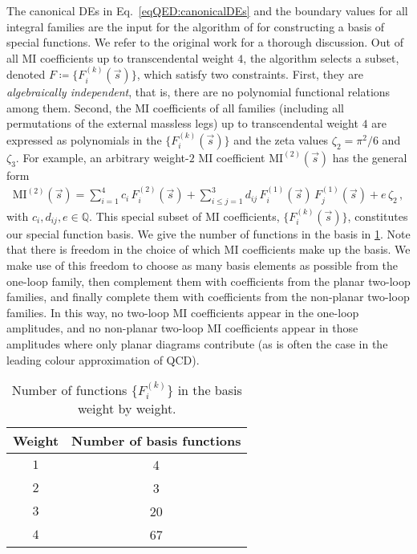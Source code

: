 \documentclass[main.tex]{subfiles}
\begin{document}
The canonical DEs in Eq.~\ref{eqQED:canonicalDEs} and the boundary values for all integral families are the input for the algorithm of  for constructing a basis of special functions. We refer to the original work for a thorough discussion. 
Out of all MI coefficients up to transcendental weight $4$, the algorithm selects a subset, denoted $F \coloneqq \{F^{(k)}_i(\vec{s})\}$, which satisfy two constraints. 
First, they are \emph{algebraically independent}, that is, there are no polynomial functional relations among them. Second, the MI coefficients of all families (including all permutations of the external massless legs) up to transcendental weight $4$ are expressed as polynomials in the $\{F^{(k)}_i(\vec{s})\}$ and the zeta values $\zeta_2 = \pi^2/6$ and $\zeta_3$. For example, an arbitrary weight-$2$ MI coefficient $\text{MI}^{(2)}(\vec{s})$ has the general form
\begin{align}
\text{MI}^{(2)}(\vec{s}) = \sum_{i=1}^{4} c_i \, F_i^{(2)}(\vec{s}) + \sum_{i \le j =1}^{3} d_{ij} \, F_i^{(1)}(\vec{s}) \,  F_j^{(1)}(\vec{s}) + e \, \zeta_2 \,,
\end{align}
with $c_i, d_{ij}, e \in \mathbb{Q}$. This special subset of MI coefficients, $\{F^{(k)}_i(\vec{s})\}$, constitutes our special function basis. We give the number of functions in the basis in \cref{tab:func_basis}. Note that there is freedom in the choice of which MI coefficients make up the basis. We make use of this freedom to choose as many basis elements as possible from the one-loop family, then complement them with coefficients from the planar two-loop families, and finally complete them with coefficients from the non-planar two-loop families. In this way, no two-loop MI coefficients appear in the one-loop amplitudes, and no non-planar two-loop MI coefficients appear in those amplitudes where only planar diagrams contribute (as is often the case in the leading colour approximation of QCD).

\begin{table}
    \centering
    \begin{tabular}{cc}
        \hline
        Weight & Number of basis functions \\
        \hline
        $1$ & 4 \\
        $2$ & 3 \\
        $3$ & 20 \\
        $4$ & 67 \\
        \hline
    \end{tabular}
    \caption{Number of functions $\{F^{(k)}_i\}$ in the basis weight by weight.}
    \label{tab:func_basis}
\end{table}
\end{document}
